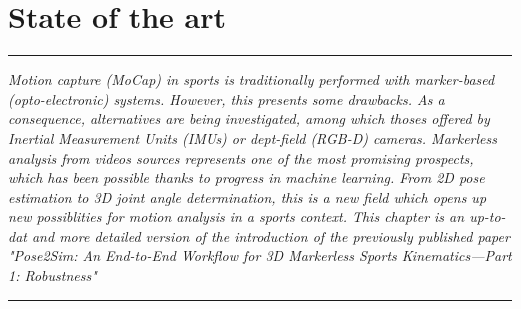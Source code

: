 
\lhead[\fancyplain{}{\leftmark}]%
      {\fancyplain{}{}} %
\chead[\fancyplain{}{}]%
      {\fancyplain{}{}}
\rhead[\fancyplain{}{}]%
      {\fancyplain{}{\rightmark}}%
\lfoot[\fancyplain{}{}]%
      {\fancyplain{}{}}
\cfoot[\fancyplain{}{\thepage}]%
      {\fancyplain{}{\thepage}} %
\rfoot[\fancyplain{}{}]%
     {\fancyplain{}{\scriptsize}}



\chapter{State of the art}
\label{ch:1}


\begin{center}
\rule{0.7\linewidth}{.5pt}
\begin{minipage}{0.7\linewidth}
\smallskip

\textit{Motion capture (MoCap) in sports is traditionally performed with marker-based (opto-electronic) systems. However, this presents some drawbacks. As a consequence, alternatives are being investigated, among which thoses offered by Inertial Measurement Units (IMUs) or dept-field (RGB-D) cameras. Markerless analysis from videos sources represents one of the most promising prospects, which has been possible thanks to progress in machine learning. From 2D pose estimation to 3D joint angle determination, this is a new field which opens up new possiblities for motion analysis in a sports context.\newline \newline
This chapter is an up-to-dat and more detailed version of the introduction of the previously published paper "Pose2Sim: An End-to-End Workflow for 3D Markerless Sports Kinematics—Part 1: Robustness" \cite{Pagnon2021} }

\end{minipage}
\smallskip
\rule{0.7\linewidth}{.5pt}
\end{center}

